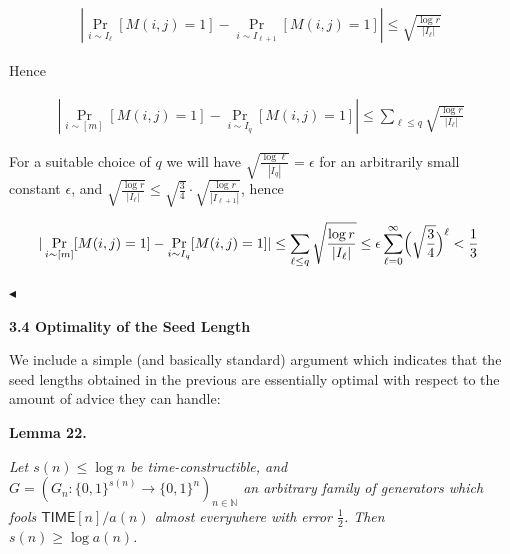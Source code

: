 \documentclass[10pt,a4paper]{article}
\begin{document}
\[\begin{gathered}
|\Pr_{i\sim I_{\ell}}[M(i,j)=1]-\Pr_{i\sim I_{\ell+1}}[M(i,j)=1]|\leq\sqrt{\frac{\log r}{|I_{\ell}|}}
\end{gathered}\]


Hence\par


\[\begin{gathered}
|\Pr_{i\sim[m]}[M(i,j)=1]-\Pr_{i\sim I_{q}}[M(i,j)=1]|\leq\sum_{\ell\leq q}\sqrt{\frac{\log r}{|I_{\ell}|}}
\end{gathered}\]


For a suitable choice of $q$ we will have $\sqrt{\frac{\log\ell}{|I_{q}|}}=\epsilon$ for an arbitrarily small constant $\epsilon$, and $\sqrt{\frac{\log r}{|I_{\ell}|}}\leq\sqrt{\frac{3}{4}}\cdot\sqrt{\frac{\log r}{|I_{\ell+1}|}}$, hence\par


\[\begin{gathered}
|\Pr_{i\sim[m]}[M(i,j)=1]-\Pr_{i\sim I_{q}}[M(i,j)=1]|\leq\sum_{\ell\leq q}\sqrt{\frac{\log r}{|I_{\ell}|}}\leq\epsilon\sum_{\ell=0}^{\infty}\Bigl{(}\sqrt{\frac{3}{4}}\Bigr{)}^{\ell}<\frac{1}{3}\
\end{gathered}\]


$\blacktriangleleft$\par






\par\medskip\noindent\textbf{
3.4 Optimality of the Seed Length}\par




We include a simple (and basically standard) argument which indicates that the seed lengths obtained in the previous are essentially optimal with respect to the amount of advice they can handle:\par





\par\medskip\noindent\textbf{
\textbf{Lemma 22}\textbf{.}
}\par



\emph{Let $s(n)\leq\log n$ be time-constructible, and $G=(G_{n}:\{0,1\}^{s(n)}\to\{0,1\}^{n})_{n\in\mathbb{N}}$ an arbitrary family of generators which fools ${\mathsf{TIME}}[n]/a(n)$ almost everywhere with error $\frac{1}{2}$. Then $s(n)\geq\log a(n)$.}\par
\end{document}

